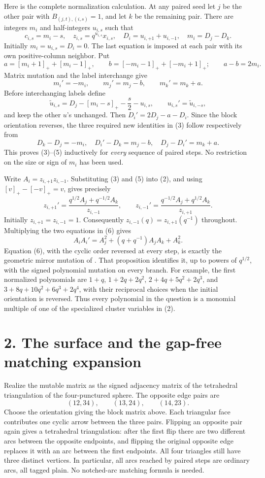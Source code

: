 \documentclass[11pt]{article}
\newcommand{\pos}[1]{[#1]_+}
\begin{document}
Here is the complete normalization calculation. At any paired seed let $j$
be the other pair with $B_{(j,t),(i,s)}=1$, and let $k$ be the remaining pair.
There are integers $m_i$ and half-integers $u_{i,s}$ such that
\[
 c_{i,s}=m_i-s,\quad z_{i,s}=q^{u_{i,s}}x_{i,s},\quad
 D_i=u_{i,+1}+u_{i,-1},\quad m_i=D_j-D_k. \tag{3}
\]
Initially $m_i=u_{i,s}=D_i=0$. The last equation is
imposed at each pair with its own positive-column neighbor. Put
\[
 a=\pos{m_i+1}+\pos{m_i-1},\qquad
 b=\pos{-m_i-1}+\pos{-m_i+1};\qquad a-b=2m_i.
\]
Matrix mutation and the label interchange give
\[
 m_i'=-m_i,\qquad m_j'=m_j-b,\qquad m_k'=m_k+a. \tag{4}
\]
Before interchanging labels define
\[
 \widetilde u_{i,s}=D_j-\pos{m_i-s}-\frac{s}{2}-u_{i,s},
 \qquad u_{i,s}'=\widetilde u_{i,-s}, \tag{5}
\]
and keep the other $u$'s unchanged. Then $D_i'=2D_j-a-D_i$.
Since the block orientation reverses, the three required new identities in
(3) follow respectively from
\[
 D_k-D_j=-m_i,\quad
 D_i'-D_k=m_j-b,\quad D_j-D_i'=m_k+a.
\]
This proves (3)--(5) inductively for \emph{every} sequence of paired steps.
No restriction on the size or sign of $m_i$ has been used.

Write $A_i=z_{i,+1}z_{i,-1}$. Substituting (3) and (5) into (2), and using
$\pos{v}-\pos{-v}=v$, gives precisely
\[
 z_{i,+1}'=\frac{q^{1/2}A_j+q^{-1/2}A_k}{z_{i,-1}},\qquad
 z_{i,-1}'=\frac{q^{-1/2}A_j+q^{1/2}A_k}{z_{i,+1}}. \tag{6}
\]
Initially $z_{i,+1}=z_{i,-1}=1$. Consequently
$z_{i,-1}(q)=z_{i,+1}(q^{-1})$ throughout. Multiplying the two equations in
(6) gives
\[
 A_iA_i'=A_j^2+(q+q^{-1})A_jA_k+A_k^2. \tag{7}
\]
Equation (6), with the cyclic order reversed at every step, is exactly the
geometric mirror mutation of \cite[Equation (4), Proposition 4.8]{mirror}.
That proposition identifies it, up to powers of $q^{1/2}$, with the signed
polynomial mutation on every branch. For example, the first normalized
polynomials are $1+q$, $1+2q+2q^2$, $2+4q+5q^2+2q^3$, and
$3+8q+10q^2+6q^3+2q^4$, with their reciprocal choices when the initial
orientation is reversed. Thus every polynomial in the question is a monomial
multiple of one of the specialized cluster variables in (2).

\section*{2. The surface and the gap-free matching expansion}
Realize the mutable matrix as the signed adjacency matrix of the tetrahedral
triangulation of the four-punctured sphere. The opposite edge pairs are
\[
 (12,34),\qquad(13,24),\qquad(14,23).
\]
Choose the orientation giving the block matrix above. Each triangular face
contributes one cyclic arrow between the three pairs. Flipping an opposite
pair again gives a tetrahedral triangulation: after the first flip there are
two different arcs between the opposite endpoints, and flipping the original
opposite edge replaces it with an arc between the first endpoints. All four
triangles still have three distinct vertices. In particular, all arcs reached
by paired steps are ordinary arcs, all tagged plain. No notched-arc matching
formula is needed.
\end{document}
